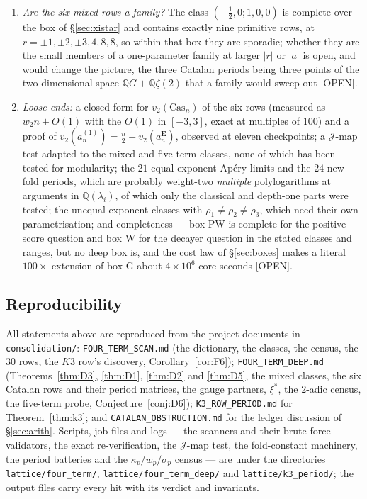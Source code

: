 \documentclass[11pt,reqno]{amsart}
\theoremstyle{plain}
\theoremstyle{definition}
\theoremstyle{remark}
\theoremstyle{plain}
\newcommand{\Q}{\mathbb{Q}}
\newcommand{\Jm}{\mathcal J}
\newcommand{\Open}{\textup{\textsf{[OPEN]}}}
\begin{document}
\begin{enumerate}[label=\textup{\arabic*.},leftmargin=2.2em]
\Open.
\item \emph{Are the six mixed rows a family?} The class $(-\tfrac12,0;1,0,0)$ is
complete over the box of \S\ref{sec:xistar} and contains exactly nine primitive
rows, at $r=\pm1,\pm2,\pm3,4,8,8$, so within that box they are sporadic; whether
they are the small members of a one-parameter family at larger $|r|$ or $|a|$ is
open, and would change the picture, the three Catalan periods being three points
of the two-dimensional space $\Q G+\Q\zeta(2)$ that a family would sweep out
\Open.
\item \emph{Loose ends:} a closed form for $v_2(\mathrm{Cas}_n)$ of the six rows
(measured as $w_2n+O(1)$ with the $O(1)$ in $[-3,3]$, exact at multiples of
$100$) and a proof of $v_2(a_n^{(1)})=\tfrac n2+v_2(a_n^{\mathbf E})$, observed
at eleven checkpoints; a $\Jm$-map test adapted to the mixed and five-term
classes, none of which has been tested for modularity; the $21$ equal-exponent
Ap\'ery limits and the $24$ new fold periods, which are probably weight-two
\emph{multiple} polylogarithms at arguments in $\Q(\lambda_i)$, of which only the
classical and depth-one parts were tested; the unequal-exponent classes with
$\rho_1\ne\rho_2\ne\rho_3$, which need their own parametrisation; and
completeness --- box PW is complete for the positive-score question and box W for
the decayer question in the stated classes and ranges, but no deep box is, and
the cost law of \S\ref{sec:boxes} makes a literal $100\times$ extension of box G
about $4\times10^6$ core-seconds \Open.
\end{enumerate}

\subsection*{Reproducibility}\label{sec:repro}
All statements above are reproduced from the project documents in
\texttt{consolidation/}: \texttt{FOUR\_TERM\_SCAN.md} (the dictionary, the
classes, the census, the $30$ rows, the $K3$ row's discovery,
Corollary~\ref{cor:F6}); \texttt{FOUR\_TERM\_DEEP.md} (Theorems~\ref{thm:D3},
\ref{thm:D1}, \ref{thm:D2} and \ref{thm:D5}, the mixed classes, the six Catalan
rows and their period matrices, the gauge partners, $\xi^*$, the $2$-adic
census, the five-term probe, Conjecture~\ref{conj:D6});
\texttt{K3\_ROW\_PERIOD.md} for Theorem~\ref{thm:k3}; and
\texttt{CATALAN\_OBSTRUCTION.md} for the ledger discussion of
\S\ref{sec:arith}. Scripts, job files and logs --- the
scanners and their brute-force validators, the exact re-verification, the
$\Jm$-map test, the fold-constant machinery, the period batteries and the
$\kappa_p/w_p/\sigma_p$ census --- are under the directories
\texttt{lattice/four\_term/}, \texttt{lattice/four\_term\_deep/} and
\texttt{lattice/k3\_period/}; the output files carry every hit with its verdict
and invariants.
\end{document}

